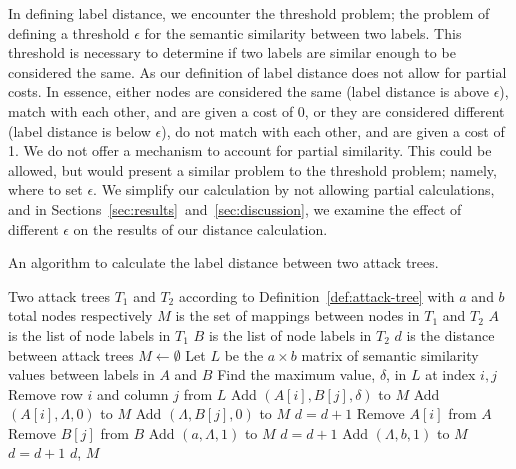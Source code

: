 In defining label distance, we encounter the threshold problem; the problem of defining a threshold $\epsilon$ for the semantic similarity between two labels. This threshold is necessary to determine if two labels are similar enough to be considered the same. As our definition of label distance does not allow for partial costs. In essence, either nodes are considered the same (label distance is above $\epsilon$), match with each other, and are given a cost of 0, or they are considered different (label distance is below $\epsilon$), do not match with each other, and are given a cost of 1. We do not offer a mechanism to account for partial similarity. This could be allowed, but would present a similar problem to the threshold problem; namely, where to set $\epsilon$. We simplify our calculation by not allowing partial calculations, and in Sections~\ref{sec:results}~and~\ref{sec:discussion}, we examine the effect of different $\epsilon$ on the results of our distance calculation.



\begin{algorithm}
    \caption{An algorithm to calculate the label distance between two attack trees.}
    \label{alg:label-distance}
    \begin{algorithmic}
        \State Two attack trees $T_1$ and $T_2$ according to Definition~\ref{def:attack-tree} with $a$ and $b$ total nodes respectively
        \State $M$ is the set of mappings between nodes in $T_1$ and $T_2$
        \State $A$ is the list of node labels in $T_1$
        \State $B$ is the list of node labels in $T_2$
        \State $d$ is the distance between attack trees
        \State $M \gets \emptyset$
        \State Let $L$ be the $a \times b$ matrix of semantic similarity values between labels in $A$ and $B$
        \State Find the maximum value, $\delta$, in $L$ at index $i, j$
        \State Remove row $i$ and column $j$ from $L$
        \If{$\delta > \epsilon$}
        \State Add $(A[i], B[j], \delta)$ to $M$
        \Else
        \State Add $(A[i], \Lambda, 0)$ to $M$
        \State Add $(\Lambda, B[j], 0)$ to $M$
        \State $d = d + 1$
        \EndIf
        \State Remove $A[i]$ from $A$
        \State Remove $B[j]$ from $B$
        \EndWhile
        \State Add $(a, \Lambda, 1)$ to $M$
        \State $d = d + 1$
        \EndFor
        \State Add $(\Lambda, b, 1)$ to $M$
        \State $d = d + 1$
        \EndFor
        \State \Return $d$, $M$
    \end{algorithmic}
\end{algorithm}





